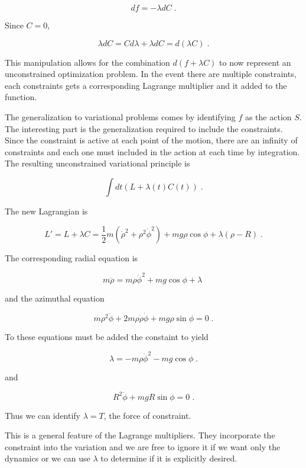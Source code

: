 \documentclass[12pt]{article}
\begin{document}
\[ df = - \lambda d C \; . \]

Since $C=0$, 

\[ \lambda d C = C d\lambda + \lambda d C = d( \lambda C) \; . \]

This manipulation allows for the combination $d(f + \lambda C)$ to now represent an unconstrained optimization problem.  In the event there are multiple constraints, each constraints gets a corresponding Lagrange multiplier and it added to the function.

The generalization to variational problems comes by identifying $f$ as the action $S$.  The interesting part is the generalization required to include the constraints.  Since the constraint is active at each point of the motion, there are an infinity of constraints and each one must included in the action at each time by integration.  The resulting unconstrained variational principle is

\[ \int dt (L + \lambda(t) C(t)) \; .\]

The new Lagrangian is
 
\[ L' = L + \lambda C = \frac{1}{2} m (\dot \rho^2 + \rho^2 \dot \phi^2) + m g \rho \cos \phi + \lambda (\rho - R) \; . \]

The corresponding radial equation is

\[ m \ddot \rho = m \rho \dot \phi^2 + m g \cos \phi + \lambda \; \]

and the azimuthal equation

\[ m \rho^2 \ddot \phi + 2 m \rho \dot \rho \dot \phi + m g \rho \sin \phi = 0 \; . \]

To these equations must be added the constaint to yield

\[  \lambda = - m \rho \dot \phi^2 - m g \cos \phi \; . \]

and 

\[ R^2 \ddot \phi + m g R \sin \phi = 0 \; . \]

Thus we can identify $\lambda = T$, the force of constraint. 

This is a general feature of the Lagrange multipliers.  They incorporate the constraint into the variation and we are free to ignore it if we want only the dynamics or we can use $\lambda$ to determine if it is explicitly desired.
\end{document}
